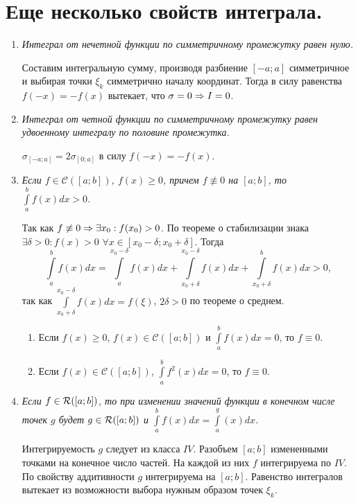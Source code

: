 \section{Еще несколько свойств интеграла.}
\begin{enumerate}
	\item \textit{Интеграл от нечетной функции по симметричному промежутку равен нулю.}
	\begin{Proof}
		Составим интегральную сумму, производя разбиение $[-a;a]$ симметричное и выбирая точки $\xi_k$ симметрично началу координат. Тогда в силу равенства $f(-x) = -f(x)$ вытекает, что $\sigma = 0 \Rightarrow I = 0$.
		\end{Proof}
	\item \textit{Интеграл от четной функции по симметричному промежутку равен удвоенному интегралу по половине промежутка.}
	\begin{Proof}
		$\sigma_{[-a;a]} = 2\sigma_{[0;a]}$ в силу $f(-x) = -f(x)$.
		\end{Proof}
	\item \textit{Если $f\in \mathcal{C}([a;b])$, $f(x) \geq 0$, причем $f\not\equiv 0$ на $[a;b]$, то $\int\limits_a^bf(x)dx > 0$.}
	\begin{Proof}
		Так как $f\not\equiv 0\Rightarrow \exists x_0 : f(x_0) > 0$. По теореме о стабилизации знака $\exists \delta >0 : f(x) > 0$ $\forall x \in [x_0-\delta; x_0 + \delta]$. Тогда $$\int\limits_a^bf(x)dx = \int\limits_a^{x_0-\delta}f(x)dx +\int\limits_{x_0+\delta}^{x_0-\delta}f(x)dx+ \int\limits_{x_0+\delta}^bf(x)dx > 0,$$
		так как $\int\limits_{x_0+\delta}^{x_0-\delta}f(x)dx = f(\xi)$, $2\delta > 0$ по теореме о среднем.
		\end{Proof}
	\begin{corollary}
		\begin{enumerate}
			\item Если $f(x)\geq 0$, $f(x) \in \mathcal{C}([a;b])$ и $\int\limits_a^bf(x)dx = 0$, то $f \equiv 0$.
			\item Если $f(x) \in \mathcal{C}([a;b])$, $\int\limits_a^bf^2(x)dx = 0$, то $f \equiv 0$.
		\end{enumerate}
		\end{corollary}
	\item \textit{Если $f\in\mathcal{R}([a; b])$, то при изменении значений функции в конечном числе точек $g$ будет $g\in\mathcal{R}([a; b])$ и $\int\limits_a^bf(x)dx = \int\limits_a^g(x)dx$.}
	\begin{Proof}
		Интегрируемость $g$ следует из класса $IV$. Разобъем $[a;b]$ измененными точками на конечное число частей. На каждой из них $f$ интегрируема по $IV$. По свойству аддитивности $g$ интегрируема на $[a;b]$. Равенство интегралов вытекает из возможности выбора нужным образом точек $\xi_k$.

\end{Proof}
\end{enumerate}
